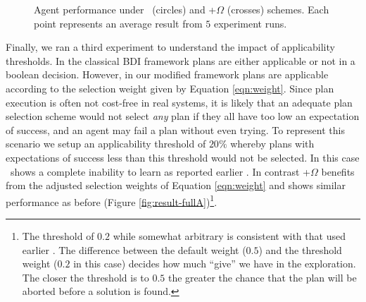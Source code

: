 \begin{figure*}[t]
\begin{center}
\qquad
{}
\vskip -0.2cm
\caption{Agent performance under \CL\ (circles) and \CL+$\Omega$ (crosses) schemes. Each point represents an average result from $5$ experiment runs.}
\label{fig:result-full}
\end{center}
\end{figure*}

Finally, we ran a third experiment to understand the impact of applicability thresholds. In the classical BDI framework plans are either applicable or not in a boolean decision. However, in our modified framework plans are applicable according to the selection weight given by Equation \ref{eqn:weight}. Since plan execution is often not cost-free in real systems, it is likely that an adequate plan selection scheme would not select \textit{any} plan if they all have too low an expectation of success, and an agent may fail a plan without even trying. To represent this scenario we setup an applicability threshold of $20\%$ whereby plans with expectations of success less than this threshold would not be selected. In this case \CL\ shows a complete inability to learn as reported earlier \cite{Singh:AAMAS10}. In contrast \CL+$\Omega$ benefits from the adjusted selection weights of Equation \ref{eqn:weight} and shows similar performance as before (Figure \ref{fig:result-fullA})\footnote{The threshold of $0.2$ while somewhat arbitrary is consistent with that used earlier \cite{Singh:AAMAS10}. The difference between the default weight ($0.5$) and the threshold weight ($0.2$ in this case) decides how much ``give'' we have in the exploration. The closer the threshold is to $0.5$ the greater the chance that the plan will be aborted before a solution is found.}.


